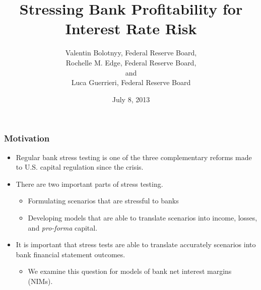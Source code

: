 \documentclass[handout]{beamer}
\title[Stressing Bank Profitability for Interest Rate Risk]
{Stressing Bank Profitability for Interest Rate Risk}
\author[Bolotnyy, Edge, \& Guerrieri]{Valentin Bolotnyy, Federal Reserve Board, \\
                           \vspace{0.05in}Rochelle M. Edge, Federal Reserve Board, \\
                           \vspace{0.05in} and \\
                           \vspace{0.05in}Luca Guerrieri, Federal Reserve Board}
\date[8/2013]{July 8, 2013}
\begin{document}

\begin{frame}
  \titlepage
\end{frame}

\begin{frame}
\frametitle{Motivation}
\begin{itemize}
\item \vspace{0.075in} Regular bank stress testing is one of the three complementary reforms made to U.S. capital regulation since the crisis.
\item \vspace{0.25in} There are two important parts of stress testing.
\begin{itemize}
\item \vspace{0.075in} Formulating scenarios that are stressful to banks
\item \vspace{0.075in} Developing models that are able to translate scenarios into income, losses, and \emph{pro-forma} capital.
\end{itemize}
\item \vspace{0.25in} It is important that stress tests are able to translate accurately scenarios into bank financial statement outcomes.
\begin{itemize}
\item \vspace{0.075in} We examine this question for models of bank net interest margins (NIMs).
\end{itemize}
\end{itemize}
\end{frame}
\end{document}
